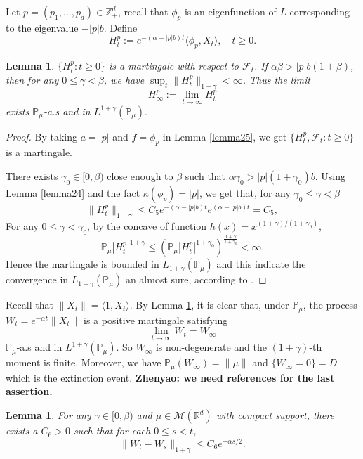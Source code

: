 \documentclass[12pt, a4paper]{amsart}
\newtheorem{lem}[thm]{Lemma}
\theoremstyle{definition}
\numberwithin{equation}{section}
\begin{document}
Let $p=(p_1,...,p_d)\in \mathbb{Z}_+^d$, recall that $\phi_p$ is an eigenfunction of $L$ corresponding to the eigenvalue $-|p|b$. Define
$$H_t^p:=e^{-(\alpha-|p|b)t}\langle\phi_p,X_t\rangle, \quad t\geq 0.$$

\begin{lem}\label{lemma26}
$\{H_t^p: t\geq0\}$ is a martingale with respect to $\mathcal{F}_t$. If $\alpha\beta>|p|b(1+\beta)$, then for any $0\leq \gamma<\beta$, we have $\sup_t\|H_t^p\|_{1+\gamma}< \infty$. Thus the limit
$$H_{\infty}^p:=\lim_{t\rightarrow \infty}H_t^p$$
exists $\mathbb{P}_{\mu}$-a.s and in $L^{1+\gamma}(\mathbb{P}_{\mu}).$
\end{lem}
\begin{proof}
    By taking $a=|p|$ and $f=\phi_p$ in Lemma \ref{lemma25}, we get $\{H_t^p, \mathcal{F}_t:t\geq 0\}$ is a martingale.

    There exists $\gamma_0 \in [0,\beta)$ close enough to $\beta$ such that $\alpha\gamma_0>|p|(1+\gamma_0)b$. Using  Lemma \eqref{lemma24} and the fact $\kappa(\phi_p)=|p|$, we get that, for any $\gamma_0\leq\gamma<\beta$
    $$\|H_t^p\|_{1+\gamma}\leq C_5e^{-(\alpha-|p|b)t}e^{(\alpha-|p|b)t}=C_5,$$
 For any $0\leq\gamma<\gamma_0$, by the concave of function $h(x)=x^{(1+\gamma)/(1+\gamma_0)}$,
    $$\mathbb{P}_{\mu}|H_t^p|^{1+\gamma}\leq(\mathbb{P}_{\mu}|H_t^p|^{1+\gamma_0})^{\frac{1+\gamma}{1+\gamma_0}}<\infty.$$
    Hence the martingale is bounded in $L_{1+\gamma}(\mathbb{P}_{\mu})$ and this indicate the convergence in $L_{1+\gamma}(\mathbb{P}_{\mu}) $ an almost sure,
    according to \cite[Theorem 5.4.5]{Durrett2010Probability}.
\end{proof}


    Recall that $\|X_t\|=\langle 1,X_t\rangle$. 
    By Lemma \ref{lemma26}, 
    it is clear that,
    under $\mathbb{P}_{\mu}$, the process $W_t=e^{-\alpha t}\|X_t\|$ is a positive martingale satisfying
$$\lim_{t\rightarrow \infty} W_t= W_{\infty}$$
$\mathbb{P}_{\mu}$-a.s and in $L^{1+\gamma}(\mathbb{P}_{\mu})$. So $W_{\infty}$ is non-degenerate and the $(1+\gamma)$-th moment is finite. Moreover, we have $\mathbb{P}_{\mu}(W_{\infty})=\|\mu\|$ and $\{W_{\infty}=0\}=D$ which is the extinction event. 
    {\bf Zhenyao: we need references for the last assertion.}
\begin{lem}\label{lemma27}
 For any $\gamma\in [0,\beta)$ and $\mu\in \mathcal M(\mathbb R^d)$ with compact support, there exists a $C_6> 0$ such that for each $0\leq s<t$,
 $$\|W_t-W_s\|_{1+\gamma}\leq C_6 e^{-\alpha s/2}.$$
\end{lem}
\end{document}
